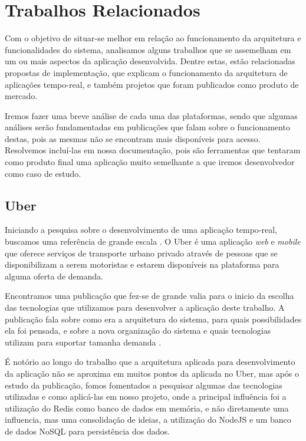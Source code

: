 \chapter{Trabalhos Relacionados}
Com o objetivo de situar-se melhor em relação ao funcionamento da arquitetura e funcionalidades do sistema, analisamos alguns trabalhos que se assemelham em um ou mais aspectos da aplicação desenvolvida. Dentre estas, estão relacionadas propostas de implementação, que explicam o funcionamento da arquitetura de aplicações tempo-real, e também projetos que foram publicados como produto de mercado.

Iremos fazer uma breve análise de cada uma das plataformas, sendo que algumas análises serão fundamentadas em publicações que falam sobre o funcionamento destas, pois as mesmas não se encontram mais disponíveis para acesso. Resolvemos incluí-las em nossa documentação, pois são ferramentas que tentaram como produto final uma aplicação muito semelhante a que iremos desenvolvedor como caso de estudo.

\section{Uber}
Iniciando a pesquisa sobre o desenvolvimento de uma aplicação tempo-real, buscamos uma referência de grande escala \cite{uber-statistics}. O Uber \cite{uber} é uma aplicação \textit{web} e \textit{mobile} que oferece serviços de transporte urbano privado através de pessoas que se disponibilizam a serem motoristas e estarem disponíveis na plataforma para alguma oferta de demanda.

Encontramos uma publicação \cite{uber-how-scales} que fez-se de grande valia para o inicio da escolha das tecnologias que utilizamos para desenvolver a aplicação deste trabalho. A publicação fala sobre como era a arquitetura do sistema, para quais possibilidades ela foi pensada, e sobre a nova organização do sistema e quais tecnologias utilizam para suportar tamanha demanda \cite{uber-statistics}.

É notório ao longo do trabalho que a arquitetura aplicada para desenvolvimento da aplicação não se aproxima em muitos pontos da aplicada no Uber, mas após o estudo da publicação, fomos fomentados a pesquisar algumas das tecnologias utilizadas e como aplicá-las em nosso projeto, onde a principal influência foi a utilização do Redis como banco de dados em memória, e não diretamente uma influencia, mas uma consolidação de ideias, a utilização do NodeJS e um banco de dados NoSQL para persistência dos dados.

